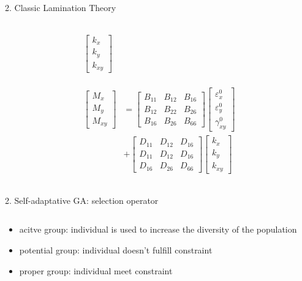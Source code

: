 \documentclass{beamer}
\begin{document}
\begin{frame}{2. Classic Lamination Theory}
\begin{columns}[c]
\begin{column}{0.5\textwidth}
\begin{equation}
\begin{array}{l}
\begin{aligned}
			\begin{bmatrix}
				k_x \\
				k_y \\
				k_{xy} 
			\end{bmatrix}  \\
		\end{aligned} \\ \\
		\begin{aligned}
			\begin{bmatrix}
				M_x \\
				M_y \\
				M_{xy}
			\end{bmatrix}
			&=
			\begin{bmatrix}
				B_{11} & B_{12} & B_{16} \\
				B_{12} & B_{22} & B_{26} \\
				B_{16} & B_{26} & B_{66} 
			\end{bmatrix}
			\begin{bmatrix}
				\varepsilon_x^0 \\
				\varepsilon_y^0 \\
				\gamma_{xy}^0
			\end{bmatrix} \\ 
			&+  
			\begin{bmatrix}
				D_{11} & D_{12} & D_{16} \\
				D_{11} & D_{12} & D_{16} \\
				D_{16} & D_{26} & D_{66} 
			\end{bmatrix}
			\begin{bmatrix}
				k_x \\
				k_y \\
				k_{xy} 
			\end{bmatrix}
		\end{aligned}
			\end{array}
		\end{equation}
	\end{column}
\end{columns}
\end{frame}

\begin{frame}{2. Self-adaptative GA: selection operator}
    \begin{columns}[c]
    \begin{column}{0.8\textwidth}
		\begin{itemize}
			\item acitve group: individual is used to increase the diversity of the population
			\item potential group: individual doesn't fulfill constraint
			\item proper group: individual meet constraint
		\end{itemize}
		
    \end{column}
\end{columns}
\end{frame}
\end{document}
